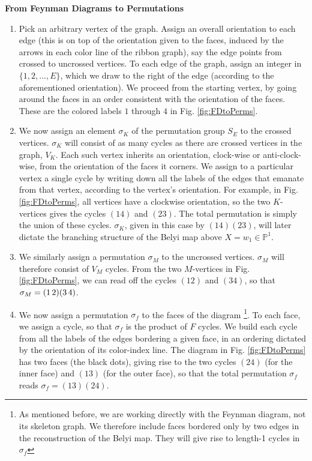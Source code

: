 \documentclass[english]{article}
\renewcommand{\>}{\rangle}
\newcommand{\<}{\langle}
\renewcommand{\(}{\left(}
\renewcommand{\)}{\right)}
\begin{document}
\noindent\textbf{From Feynman Diagrams to Permutations}
\begin{enumerate}
    \item Pick an arbitrary vertex of the graph. Assign an overall orientation to each edge (this is on top of the orientation given to the faces, induced by the arrows in each color line of the ribbon graph), say the edge points from crossed to uncrossed vertices. To each edge of the graph, assign an integer in $\{1,2,...,E\}$, which we draw to the right of the edge (according to the aforementioned orientation). We proceed from the starting vertex, by going around the faces in an order consistent with the orientation of the faces. These are the colored labels $1$ through $4$ in Fig. \ref{fig:FDtoPerms}.
    \item We now assign an element $\sigma_{K}$ of the permutation group $S_{E}$ to the crossed vertices. $\sigma_{K}$ will consist of as many cycles as there are crossed vertices in the graph, $V_{K}$. Each such vertex inherits an orientation, clock-wise or anti-clock-wise, from the orientation of the faces it corners. We assign to a particular vertex a single cycle by writing down all the labels of the edges that emanate from that vertex, according to the vertex's orientation. For example, in Fig. \ref{fig:FDtoPerms}, all vertices have a clockwise orientation, so the two $K$-vertices gives the cycles $(14)$ and $(23)$.  The total permutation is simply the union of these cycles. $\sigma_{K}$, given in this case by $(14)(23)$, will later dictate the branching structure of the Belyi map above $X=w_1\in \mathbb{P}^{1}$.
    \item We similarly assign a permutation $\sigma_{M}$ to the uncrossed vertices. $\sigma_{M}$ will therefore consist of $V_{M}$ cycles. From the two $M$-vertices in Fig. \ref{fig:FDtoPerms}, we can read off the cycles $(12)$ and $(34)$, so that $\sigma_{M}= (1\thinspace2)(3\thinspace4)$. 
    \item We now assign a permutation $\sigma_{f}$ to the faces of the diagram \footnote{As mentioned before, we are working directly with the Feynman diagram, not its skeleton graph. We therefore include faces bordered only by two edges in the reconstruction of the Belyi map. They will give rise to length-1 cycles in $\sigma_{f}$}. To each face, we assign a cycle, so that $\sigma_{f}$ is the product of $F$ cycles. We build each cycle from all the labels of the edges bordering a given face, in an ordering dictated by the orientation of its color-index line. The diagram in Fig. \ref{fig:FDtoPerms} has two faces (the black dots), giving rise to the two cycles $(24)$ (for the inner face) and $(13)$ (for the outer face), so that the total permutation $\sigma_{f}$ reads $\sigma_{f}=(13)(24)$. 
\end{enumerate}
\end{document}
